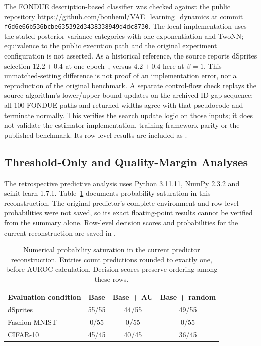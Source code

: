 \documentclass[make,article,submit,pdftex,moreauthors]{Definitions/mdpi}
\begin{document}
The FONDUE description-based classifier was checked against the public
repository \url{https://github.com/bonheml/VAE_learning_dynamics} at
commit \texttt{f6d6e66b536bcbe635392d3438338949d4dc8730}. The local
implementation uses the stated posterior-variance categories with one
exponentiation and TwoNN; equivalence to the public execution path and
the original experiment configuration is not asserted. As a historical
reference, the source reports dSprites selection $12.2\pm0.4$ at one
epoch~\cite{bonheme2022fondue}, versus $4.2\pm0.4$ here at $\beta=1$.
This unmatched-setting difference is not proof of an implementation
error, nor a reproduction of the original benchmark.
A separate control-flow check replays the source algorithm's
lower/upper-bound updates on the archived ID-gap sequence: all 100
FONDUE paths and returned widths agree with that pseudocode and
terminate normally. This verifies the search update logic on those
inputs; it does not validate the estimator implementation, training
framework parity or the published benchmark. Its row-level results
are included as .

\subsection{Threshold-Only and Quality-Margin Analyses}\label{app:sensitivity}
The retrospective predictive analysis uses Python 3.11.11,
NumPy 2.3.2 and scikit-learn 1.7.1. Table~\ref{tab:saturation}
documents probability saturation in this reconstruction. The original
predictor's complete environment and row-level probabilities were not
saved, so its exact floating-point results cannot be verified from the
summary alone. Row-level decision scores and probabilities for the
current reconstruction are saved in .
\begin{table}[H]
\caption{Numerical probability saturation in the current predictor reconstruction. Entries count predictions rounded to exactly one, before AUROC calculation. Decision scores preserve ordering among these rows.}\label{tab:saturation}
\small
\setlength{\tabcolsep}{3.5pt}
\begin{tabular*}{\textwidth}{@{\extracolsep{\fill}}lccc@{}}
\toprule
Evaluation condition & Base & Base + AU & Base + random \\
\midrule
dSprites & 55/55 & 44/55 & 49/55 \\
Fashion-MNIST & 0/55 & 0/55 & 0/55 \\
CIFAR-10 & 45/45 & 40/45 & 36/45 \\
\bottomrule
\end{tabular*}
\end{table}
\end{document}
